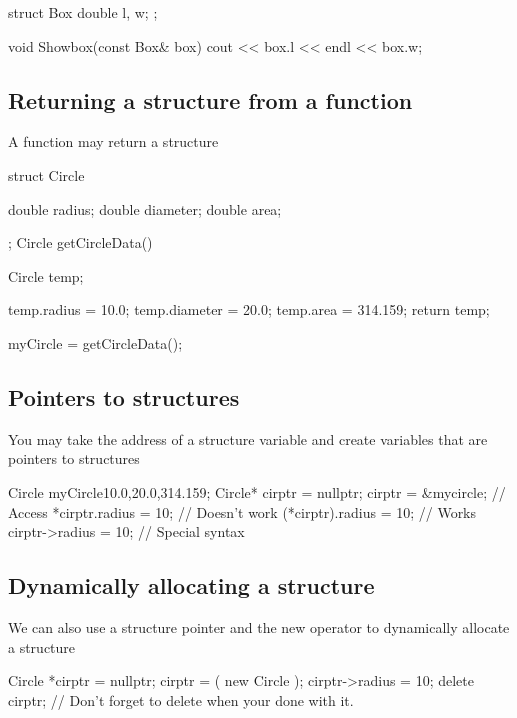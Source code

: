 \documentclass{report}
\begin{document}
	\begin{cppcode}
struct Box {
    double l, w;
};

void Showbox(const Box& box) {
    cout << box.l << endl << box.w;
}
	\end{cppcode}
	

	\bigbreak \noindent 
	\subsection{Returning a structure from a function}
	\bigbreak \noindent 
	\begin{concept}
	   A function may return a structure 
	\end{concept}
	\bigbreak \noindent 
	
	\begin{cppcode}
struct Circle {
    double radius;
    double diameter;
    double area;

};
Circle getCircleData() {
    Circle temp;

    temp.radius = 10.0;
    temp.diameter = 20.0;
    temp.area = 314.159;
    return temp;
}
myCircle = getCircleData();
	\end{cppcode}
	

	\pagebreak
	\subsection{Pointers to structures}
	\bigbreak \noindent 
	\begin{concept}
	   You may take the address of a structure variable and create variables that are pointers to structures 
	\end{concept}
	\bigbreak \noindent 
	
	\begin{cppcode}
Circle myCircle{10.0,20.0,314.159};
Circle* cirptr = nullptr;
cirptr = &mycircle;
// Access
*cirptr.radius = 10; // Doesn't work
(*cirptr).radius = 10; // Works
cirptr->radius = 10; // Special syntax
	\end{cppcode}
	
	\bigbreak \noindent 

	\bigbreak \noindent 
	\subsection{Dynamically allocating a structure}
	\bigbreak \noindent 
	We can also use a structure pointer and the new operator to dynamically allocate a structure
	\bigbreak \noindent 
	
	\begin{cppcode}
Circle *cirptr = nullptr;
cirptr = ( new Circle );
cirptr->radius = 10;
delete cirptr; // Don't forget to delete when your done with it.
	\end{cppcode}
	
\end{document}
